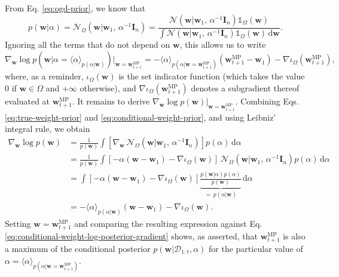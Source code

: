 From Eq. \eqref{eq:ogd-prior}, we know that
\begin{equation}
\label{eq:conditional-weight-prior}
	p(\mathbf{w}|\alpha)
	= \mathcal{N}_{\Omega}(\mathbf{w}|\mathbf{w}_1, \, \alpha^{-1}\mathbf{I}_n)
	= \frac{\mathcal{N}(\mathbf{w}|\mathbf{w}_1, \, \alpha^{-1}\mathbf{I}_n)\mathds{1}_{\Omega}(\mathbf{w})}
	{\int \mathcal{N}(\mathbf{w}|\mathbf{w}_1, \, \alpha^{-1}\mathbf{I}_n)\mathds{1}_{\Omega}(\mathbf{w}) \, \mathrm{d}\mathbf{w}}.
\end{equation}
Ignoring all the terms that do not depend on $\mathbf{w}$, this allows us to write
\begin{equation}
\label{eq:conditional-weight-log-posterior-gradient}
	\nabla_{\mathbf{w}}\log p(\mathbf{w}|\alpha = \langle\alpha\rangle_{p(\alpha|\mathbf{w})})\big|_{\mathbf{w}=\mathbf{w}_{t+1}^\text{MP}}
	= -\langle\alpha\rangle_{p(\alpha|\mathbf{w}=\mathbf{w}_{t+1}^\text{MP})}(\mathbf{w}_{t+1}^\text{MP} - \mathbf{w}_1) - \nabla\iota_{\Omega}(\mathbf{w}_{t+1}^\text{MP}),
\end{equation}
where, as a reminder, $\iota_{\Omega}(\mathbf{w})$ is the set indicator function (which takes the value $0$ if $\mathbf{w} \in \Omega$ and $+\infty$ otherwise), and $\nabla\iota_{\Omega}(\mathbf{w}_{t+1}^\text{MP})$ denotes a subgradient thereof evaluated at $\mathbf{w}_{t+1}^\text{MP}$.
It remains to derive $\nabla_{\mathbf{w}} \log p(\mathbf{w})|_{\mathbf{w}=\mathbf{w}_{t+1}^\text{MP}}$. Combining Eqs. \eqref{eq:true-weight-prior} and \eqref{eq:conditional-weight-prior}, and using Leibniz' integral rule, we obtain
\begin{equation}
\begin{split}
	\nabla_{\mathbf{w}} \log p(\mathbf{w})
	&= \frac{1}{p(\mathbf{w})}
	\int [\nabla_{\mathbf{w}}\,\mathcal{N}_{\Omega}(\mathbf{w}|\mathbf{w}_1, \, \alpha^{-1}\mathbf{I}_n)]p(\alpha)\,\mathrm{d}\alpha
	\\
	&= \frac{1}{p(\mathbf{w})}
	\int [-\alpha(\mathbf{w}-\mathbf{w}_1) - \nabla\iota_{\Omega}(\mathbf{w})]\,\mathcal{N}_{\Omega}(\mathbf{w}|\mathbf{w}_1, \, \alpha^{-1}\mathbf{I}_n)p(\alpha)\,\mathrm{d}\alpha
	\\
	&= \int [-\alpha(\mathbf{w}-\mathbf{w}_1) - \nabla\iota_{\Omega}(\mathbf{w})]\underbrace{\frac{p(\mathbf{w}|\alpha)p(\alpha)}{p(\mathbf{w})}}_{= \, p(\alpha|\mathbf{w})}\,\mathrm{d}\alpha
	\\
	&= -\langle\alpha\rangle_{p(\alpha|\mathbf{w})}(\mathbf{w}-\mathbf{w}_1) - \nabla\iota_{\Omega}(\mathbf{w}).
\end{split}
\end{equation}
Setting $\mathbf{w} = \mathbf{w}_{t+1}^\text{MP}$ and comparing the resulting expression against Eq. \eqref{eq:conditional-weight-log-posterior-gradient} shows, as asserted, that $\mathbf{w}_{t+1}^\text{MP}$ is also a maximum of the conditional posterior $p(\mathbf{w}|\mathcal{D}_{1:t}, \alpha)$ for the particular value of $\alpha = \langle\alpha\rangle_{p(\alpha|\mathbf{w}=\mathbf{w}_{t+1}^\text{MP})}$.


